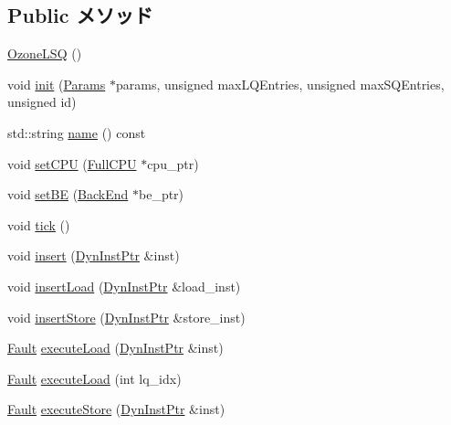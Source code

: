 \subsection*{Public メソッド}
\begin{DoxyCompactItemize}
\item 
\hyperlink{classOzoneLSQ_a31be199d33faeff7e77c7ed894288f5b}{OzoneLSQ} ()
\item 
void \hyperlink{classOzoneLSQ_ae8565b0968a8115705f1585e8aa21f75}{init} (\hyperlink{classOzoneLSQ_a818e103eae798a24a06a0a34631849ea}{Params} $\ast$params, unsigned maxLQEntries, unsigned maxSQEntries, unsigned id)
\item 
std::string \hyperlink{classOzoneLSQ_a37627d5d5bba7f4a8690c71c2ab3cb07}{name} () const 
\item 
void \hyperlink{classOzoneLSQ_ad491c9766121fc19aa77fd0723e7641d}{setCPU} (\hyperlink{classOzoneLSQ_a90ba84e54618cc07f2e8f05e046cb5ce}{FullCPU} $\ast$cpu\_\-ptr)
\item 
void \hyperlink{classOzoneLSQ_a9134276ed85820d74779ad5826580822}{setBE} (\hyperlink{classBackEnd}{BackEnd} $\ast$be\_\-ptr)
\item 
void \hyperlink{classOzoneLSQ_a873dd91783f9efb4a590aded1f70d6b0}{tick} ()
\item 
void \hyperlink{classOzoneLSQ_a773e88db1aa010c3755e603493bf40ec}{insert} (\hyperlink{classOzoneLSQ_a028ce10889c5f6450239d9e9a7347976}{DynInstPtr} \&inst)
\item 
void \hyperlink{classOzoneLSQ_ad22b3ecafed2bcd9c59fcab049a1cb98}{insertLoad} (\hyperlink{classOzoneLSQ_a028ce10889c5f6450239d9e9a7347976}{DynInstPtr} \&load\_\-inst)
\item 
void \hyperlink{classOzoneLSQ_a6a4b4e51bfff3639932ebaba45e8a282}{insertStore} (\hyperlink{classOzoneLSQ_a028ce10889c5f6450239d9e9a7347976}{DynInstPtr} \&store\_\-inst)
\item 
\hyperlink{classRefCountingPtr}{Fault} \hyperlink{classOzoneLSQ_a30c6332142c2ecca389ed6ee463c692b}{executeLoad} (\hyperlink{classOzoneLSQ_a028ce10889c5f6450239d9e9a7347976}{DynInstPtr} \&inst)
\item 
\hyperlink{classRefCountingPtr}{Fault} \hyperlink{classOzoneLSQ_a091a4d1788ce66e51ceb888bbd85ac08}{executeLoad} (int lq\_\-idx)
\item 
\hyperlink{classRefCountingPtr}{Fault} \hyperlink{classOzoneLSQ_aad78b8a37ee5c61e47df58dd39980340}{executeStore} (\hyperlink{classOzoneLSQ_a028ce10889c5f6450239d9e9a7347976}{DynInstPtr} \&inst)
\item 

\end{DoxyCompactItemize}

